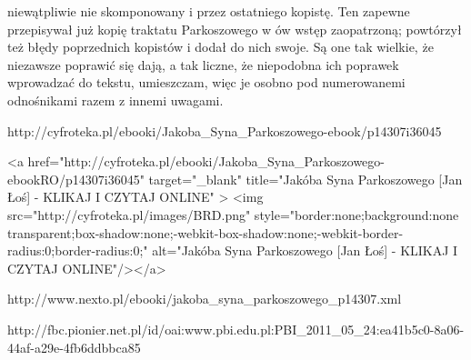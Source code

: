 niewątpliwie nie skomponowany i przez ostatniego kopistę. Ten zapewne przepisywał już kopię traktatu Parkoszowego w ów wstęp zaopatrzoną; powtórzył też błędy poprzednich kopistów i dodał do nich swoje. Są one tak wielkie, że niezawsze poprawić się dają, a tak liczne, że niepodobna ich poprawek wprowadzać do tekstu, umieszczam, więc je osobno pod numerowanemi odnośnikami razem z innemi uwagami.

http://cyfroteka.pl/ebooki/Jakoba_Syna_Parkoszowego-ebook/p14307i36045

<a href="http://cyfroteka.pl/ebooki/Jakoba_Syna_Parkoszowego-ebookRO/p14307i36045" target="_blank" title="Jakóba Syna Parkoszowego [Jan Łoś]  - KLIKAJ I CZYTAJ ONLINE" > <img src="http://cyfroteka.pl/images/BRD.png" style="border:none;background:none transparent;box-shadow:none;-webkit-box-shadow:none;-webkit-border-radius:0;border-radius:0;" alt="Jakóba Syna Parkoszowego [Jan Łoś]  - KLIKAJ I CZYTAJ ONLINE"/></a>

http://www.nexto.pl/ebooki/jakoba_syna_parkoszowego_p14307.xml

http://fbc.pionier.net.pl/id/oai:www.pbi.edu.pl:PBI_2011_05_24:ea41b5c0-8a06-44af-a29e-4fb6ddbbca85

